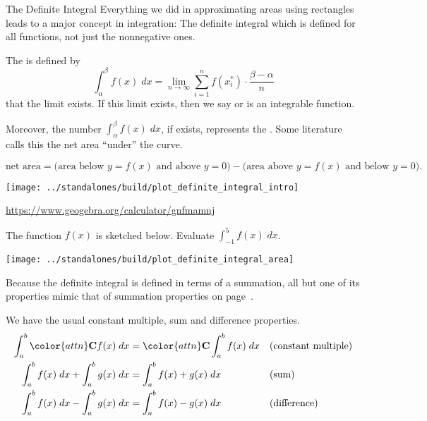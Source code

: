 \documentclass[../main.tex]{subfiles}
\begin{document}
\begin{lesson}{The Definite Integral}
  Everything we did in approximating areas using rectangles leads to a major concept in integration: The definite integral which is defined for all functions, not just the nonnegative ones.
  \begin{mdframed}[style=withref-compact]
    The  is defined by 
    \begin{equation} \label{eq:definite-integral} 
      \int_{\alpha}^{\beta} f(x) \;dx = \lim_{n \to \infty} \sum_{i=1}^{n} f(x_{i}^{*}) \cdot \frac{\beta-\alpha}{n}
    \end{equation}
     that the limit exists. If this limit exists, then we say  or is an integrable function. 

    Moreover, the number \(\int_{\alpha}^{\beta} f(x) \;dx\), if exists, represents the  . Some literature calls this the net area ``under'' the curve.
  \end{mdframed}
  \[
    \text{net area} = \bigg(\text{area below \(y = f(x)\) and above \(y = 0\)}\bigg) - \bigg(\text{area above \(y = f(x)\) and below \(y = 0\)}\bigg).
  \]
  
  \texttt{[image: ../standalones/build/plot\_definite\_integral\_intro]}

  \url{https://www.geogebra.org/calculator/gnfmamnj}
  
  \begin{example} \label{ex:definite-integral-area}
    The function \(f(x)\) is sketched below. Evaluate \(\int_{-1}^{5} f(x) \;dx\).

    \texttt{[image: ../standalones/build/plot\_definite\_integral\_area]}
  \end{example}
  \clearpage

  Because the definite integral is defined in terms of a summation, all but one of its properties mimic that of summation properties on page~\pageref{page:summation-properties}.

  We have the usual constant multiple, sum and difference properties.
  \begin{align*}
    \int_{a}^{b} {\color{attn} \mathbf{C}} f(x) \;dx &= {\color{attn} \mathbf{C}} \int_{a}^{b} f(x) \;dx && \text{(constant multiple)}\\
    \int_{a}^{b} f(x) \;dx + \int_{a}^{b} g(x) \;dx &= \int_{a}^{b} f(x) + g(x) \;dx && \text{(sum)} \\
    \int_{a}^{b} f(x) \;dx - \int_{a}^{b} g(x) \;dx &= \int_{a}^{b} f(x) - g(x) \;dx && \text{(difference)}
  \end{align*}
    

\end{lesson}
\end{document}

